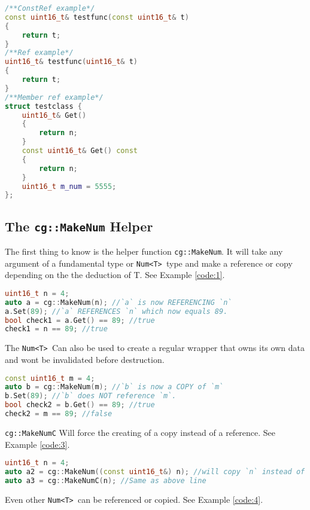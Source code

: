 \documentclass{article}
\newcommand{\theobj}{\protect\Verb+Num<T> +}
\begin{document}
\begin{lstlisting}[language=C++, label=code:test, caption=Test Functions and Classes]
/**ConstRef example*/
const uint16_t& testfunc(const uint16_t& t)
{
	return t;
}
/**Ref example*/
uint16_t& testfunc(uint16_t& t)
{
	return t;
}
/**Member ref example*/
struct testclass {
	uint16_t& Get()
	{
		return n;
	}
	const uint16_t& Get() const
	{
		return n;
	}
	uint16_t m_num = 5555;
};
\end{lstlisting}
\pagebreak
\subsection{The \protect\Verb+cg::MakeNum+ Helper}
\label{s:helper}

The first thing to know is the helper function \protect\Verb+cg::MakeNum+.  It will take any argument of a fundamental type or \theobj type and make a reference or copy depending on the the deduction of T. See Example \vref{code:1}. 

\begin{lstlisting}[language=C++, label=code:1, caption=Reference with cg::MakeNum]
uint16_t n = 4;
auto a = cg::MakeNum(n); //`a` is now REFERENCING `n`
a.Set(89); //`a` REFERENCES `n` which now equals 89.
bool check1 = a.Get() == 89; //true
check1 = n == 89; //true
\end{lstlisting}

The \theobj Can also be used to create a regular wrapper that owns its own data and wont be invalidated before destruction.  

\begin{lstlisting}[language=C++, label=code:2, caption=Copy with cg::MakeNum]
const uint16_t m = 4;
auto b = cg::MakeNum(m); //`b` is now a COPY of `m`
b.Set(89); //`b` does NOT reference `m`.
bool check2 = b.Get() == 89; //true
check2 = m == 89; //false
\end{lstlisting}

\protect\Verb+cg::MakeNumC+ Will force the creating of a copy instead of a reference. See Example \vref{code:3}.

\begin{lstlisting}[language=C++, label=code:3, caption=cg::Forcing Copies]
uint16_t n = 4;
auto a2 = cg::MakeNum((const uint16_t&) n); //will copy `n` instead of reference.
auto a3 = cg::MakeNumC(n); //Same as above line
\end{lstlisting}

Even other \theobj can be referenced or copied. See Example \vref{code:4}.
\end{document}
